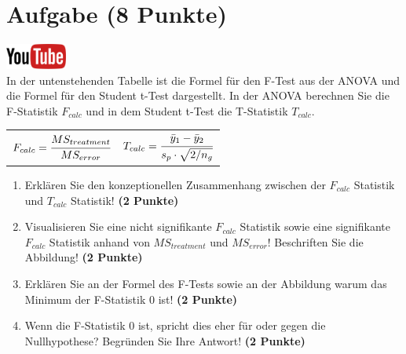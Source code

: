 \documentclass[a4paper, 9pt]{scrartcl}\usepackage[]{graphicx}\usepackage[]{xcolor}
\begin{document}
\clearpage

\section{Aufgabe \hfill (8 Punkte)}


\hfill\href{https://youtu.be/FjjJXkFJfIY}{\includegraphics[width =
  2cm]{img/youtube}}\\[1Ex]


In der untenstehenden Tabelle ist die Formel f{\"u}r den F-Test aus der ANOVA
und die Formel f{\"u}r den Student t-Test dargestellt. In der ANOVA berechnen
Sie die F-Statistik $F_{calc}$ und in dem Student t-Test die T-Statistik
$T_{calc}$.

\begin{center}
  \begin{tabular}{cc}
    $F_{calc} = \cfrac{MS_{treatment}}{MS_{error}}$ & $T_{calc} = \cfrac{\bar{y}_1 - \bar{y}_2}{s_p \cdot \sqrt{2/n_g}}$\\
  \end{tabular}
\end{center}


\begin{enumerate}
\item Erkl{\"a}ren Sie den konzeptionellen Zusammenhang zwischen der $F_{calc}$
  Statistik und $T_{calc}$ Statistik! \textbf{(2 Punkte)}
\item Visualisieren Sie eine nicht signifikante $F_{calc}$ Statistik sowie
  eine signifikante $F_{calc}$ Statistik anhand von $MS_{treatment}$ und
  $MS_{error}$! Beschriften Sie die Abbildung! \textbf{(2 Punkte)}
\item Erkl{\"a}ren Sie an der Formel des F-Tests sowie an der Abbildung warum
  das Minimum der F-Statistik 0 ist! \textbf{(2 Punkte)}
\item Wenn die F-Statistik 0 ist, spricht dies eher f{\"u}r oder gegen die
  Nullhypothese? Begr{\"u}nden Sie Ihre Antwort! \textbf{(2 Punkte)}
\end{enumerate}

 
\clearpage
\end{document}
